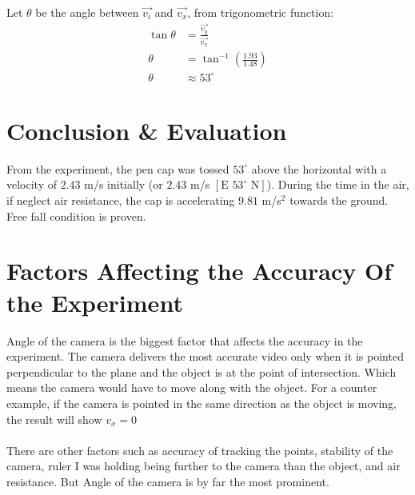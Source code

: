 \documentclass{article}
\begin{document}
Let $\theta$ be the angle between $\Vec{v_i}$ and $\Vec{v_x}$, from trigonometric function:
\begin{align*}
    \tan \theta&=\frac{\Vec{v_y}}{\Vec{v_x}}\\
    \theta&=\tan^{-1}\left(\frac{1.93}{1.48}\right)\\
    \theta&\approx 53^\circ
\end{align*}

\pagebreak
\section{Conclusion \& Evaluation}
From the experiment, the pen cap was tossed $53^\circ$ above the horizontal with a velocity of $2.43$ m/s initially (or $2.43$ m/s $\left[\text{E } 53^\circ \text{ N}\right]$). During the time in the air, if neglect air resistance, the cap is accelerating $9.81$ m/s$^2$ towards the ground. Free fall condition is proven.

\section{Factors Affecting the Accuracy Of the Experiment}

Angle of the camera is the biggest factor that affects the accuracy in the experiment. The camera delivers the most accurate video only when it is pointed perpendicular to the plane and the object is at the point of intersection. Which means the camera would have to move along with the object. For a counter example, if the camera is pointed in the same direction as the object is moving, the result will show $v_x=0$\\\\
There are other factors such as accuracy of tracking the points, stability of the camera, ruler I was holding being further to the camera than the object, and air resistance. But Angle of the camera is by far the most prominent.




\end{document}
